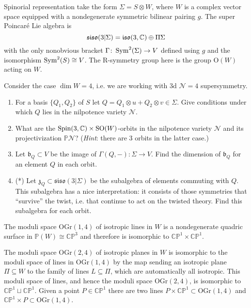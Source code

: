 Spinorial representation take the form $\Sigma = S\otimes W$, where $W$ is a complex vector space equipped with a nondegenerate symmetric bilinear pairing $g$. The super Poincar\'e Lie algebra is
\[\mathfrak{siso}(3|\Sigma) = \mathfrak{iso}(3,\mathbb{C})\oplus \Pi \Sigma\]
with the only nonobvious bracket $\Gamma\colon \operatorname{Sym}^2(\Sigma)\rightarrow V$ defined using $g$ and the isomorphism $\operatorname{Sym}^2(S)\cong V$.  The R-symmetry group here is the group $\mathrm O(W)$ acting on $W$.

Consider the case $\dim W = 4$, i.e. we are working with 3d $\mathcal N=4$ supersymmetry.

\begin{enumerate}
	\item For a basis $\{Q_1,Q_2\}$ of $S$ let $Q=Q_1\otimes u + Q_2\otimes v\in\Sigma$. Give conditions under which $Q$ lies in the nilpotence variety $\mathcal N$.
	
	\item What are the $\mathrm{Spin}(3, \mathbb{C}) \times \mathrm{SO}(W)$-orbits in the nilpotence variety $\mathcal N$ and its projectivization $\mathbb {P}\mathcal N$? (\emph{Hint}: there are 3 orbits in the latter case.)
	
	\item Let $\mathfrak b_Q\subset V$ be the image of $\Gamma(Q, -)\colon \Sigma\rightarrow V$. Find the dimension of $\mathfrak b_Q$ for an element $Q$ in each orbit.
	
	\item (*) Let $\mathfrak z_Q\subset \mathfrak{siso}(3|\Sigma)$ be the subalgebra of elements commuting with $Q$. This subalgebra has a nice interpretation: it consists of those symmetries that ``survive'' the twist, i.e. that continue to act on the twisted theory. Find this subalgebra for each orbit.
\end{enumerate}

\begin{remark}
	The moduli space $\mathrm{OGr}(1, 4)$ of isotropic lines in $W$ is a nondegenerate quadric surface in $\mathbb P(W) \cong \mathbb{CP}^3$ and therefore is isomorphic to $\mathbb{CP}^1\times\mathbb{CP}^1$.
\end{remark}

\begin{remark}
	The moduli space $\mathrm{OGr}(2, 4)$ of isotropic planes in $W$ is isomorphic to the moduli space of lines in $\mathrm{OGr}(1, 4)$ by the map sending an isotropic plane $\Pi \subseteq W$ to the family of lines $L \subseteq\Pi$, which are automatically all isotropic. This moduli space of lines, and hence the moduli space $\mathrm{OGr}(2,4)$, is isomorphic to $\mathbb{CP}^1\sqcup\mathbb{CP}^1$.  Given a point $P\in\mathbb{CP}^1$ there are two lines $P\times \mathbb{CP}^1\subset \mathrm{OGr}(1, 4)$ and $\mathbb{CP}^1\times P\subset \mathrm{OGr}(1, 4)$.
\end{remark}
